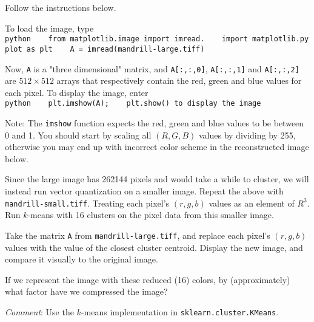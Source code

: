 \documentclass[11pt]{article}
\begin{document}
Follow the instructions below.

To load the image, type
\texttt{python\ \ \ \ from\ matplotlib.image\ import\ imread.\ \ \ \ import\ matplotlib.pyplot\ as\ plt\ \ \ \ A\ =\ imread(\textquotesingle{}mandrill-large.tiff\textquotesingle{})}

Now, \texttt{A} is a "three dimensional" matrix, and
\texttt{A{[}:,:,0{]}}, \texttt{A{[}:,:,1{]}} and \texttt{A{[}:,:,2{]}}
are \(512 \times 512\) arrays that respectively contain the red, green
and blue values for each pixel. To display the image, enter
\texttt{python\ \ \ \ plt.imshow(A);\ \ \ \ plt.show()\ to\ display\ the\ image}

Note: The \texttt{imshow} function expects the red, green and blue
values to be between 0 and 1. You should start by scaling all
\((R,G,B)\) values by dividing by 255, otherwise you may end up with
incorrect color scheme in the reconstructed image below.

Since the large image has 262144 pixels and would take a while to
cluster, we will instead run vector quantization on a smaller image.
Repeat the above with \texttt{mandrill-small.tiff}. Treating each
pixel's \((r, g, b)\) values as an element of \(R^3\). Run \(k\)-means
with 16 clusters on the pixel data from this smaller image.

Take the matrix \texttt{A} from \texttt{mandrill-large.tiff}, and
replace each pixel's \((r, g, b)\) values with the value of the closest
cluster centroid. Display the new image, and compare it visually to the
original image.

If we represent the image with these reduced (16) colors, by
(approximately) what factor have we compressed the image?

\emph{Comment}: Use the \(k\)-means implementation in
\texttt{sklearn.cluster.KMeans}.
\end{document}
